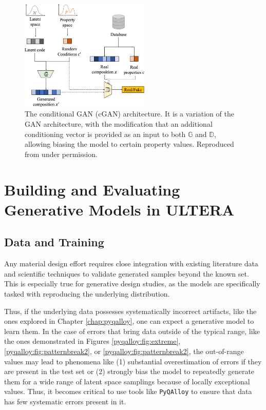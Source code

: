 \begin{figure}[H]
    \centering
    \includegraphics[width=0.55\textwidth]{inversedesign/inverse_fig2.png}
    \caption{The conditional GAN (cGAN) architecture. It is a variation of the GAN architecture, with the modification that an additional conditioning vector is provided as an input to both $\mathbb{G}$ and $\mathbb{D}$, allowing biasing the model to certain property values. Reproduced from \cite{Debnath2023ComparingAlloys} under permission.}
    \label{inverse:fig:cgan}
\end{figure}



\section{Building and Evaluating Generative Models in ULTERA} \label{inverse:sec:buildinggan}

\subsection{Data and Training} \label{inverse:ssec:datatrain}

Any material design effort requires close integration with existing literature data and scientific techniques to validate generated samples beyond the known set. This is especially true for generative design studies, as the models are specifically tasked with reproducing the underlying distribution. 

Thus, if the underlying data possesses systematically incorrect artifacts, like the ones explored in Chapter \ref{chap:pyqalloy}, one can expect a generative model to learn them. In the case of errors that bring data outside of the typical range, like the ones demonstrated in Figures \ref{pyqalloy:fig:extreme}, \ref{pyqalloy:fig:patternbreak2}, or \ref{pyqalloy:fig:patternbreak2}, the out-of-range values may lead to phenomena like (1) substantial overestimation of errors if they are present in the test set or (2) strongly bias the model to repeatedly generate them for a wide range of latent space samplings because of locally exceptional values. Thus, it becomes critical to use tools like \texttt{PyQAlloy} to ensure that data has few systematic errors present in it.

